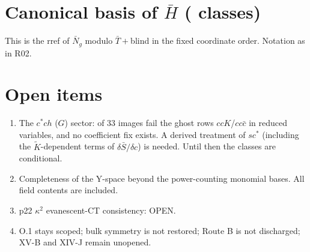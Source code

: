 \documentclass[11pt]{article}
\begin{document}
\section{Canonical basis of $\bar H$ (\HB{} classes)}
This is the rref of $\bar N_g$ modulo $\bar T+$blind in the fixed coordinate order. Notation as in R02.


\section{Open items}
\begin{enumerate}
\item The $c^*ch$ ($G$) sector: \GM{} of 33 images fail the ghost rows $ccK$/$cc\bar c$ in reduced variables, and no coefficient fix exists. A derived treatment of
$s c^*$ (including the $\tilde K$-dependent terms of $\delta\bar S/\delta c$) is needed. Until then the \HB{} classes are conditional.
\item Completeness of the Y-space beyond the power-counting monomial bases. All field contents are included.
\item p22 $\kappa^2$ evanescent-CT consistency: OPEN.
\item O.1 stays scoped; bulk symmetry is not restored; Route B is not discharged; XV-B and XIV-J remain unopened.
\end{enumerate}
\end{document}
